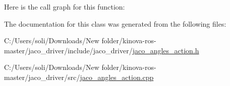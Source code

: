 Here is the call graph for this function\+:




The documentation for this class was generated from the following files\+:\begin{DoxyCompactItemize}
\item 
C\+:/\+Users/soli/\+Downloads/\+New folder/kinova-\/ros-\/master/jaco\+\_\+driver/include/jaco\+\_\+driver/\hyperlink{jaco__angles__action_8h}{jaco\+\_\+angles\+\_\+action.\+h}\item 
C\+:/\+Users/soli/\+Downloads/\+New folder/kinova-\/ros-\/master/jaco\+\_\+driver/src/\hyperlink{jaco__angles__action_8cpp}{jaco\+\_\+angles\+\_\+action.\+cpp}\end{DoxyCompactItemize}
